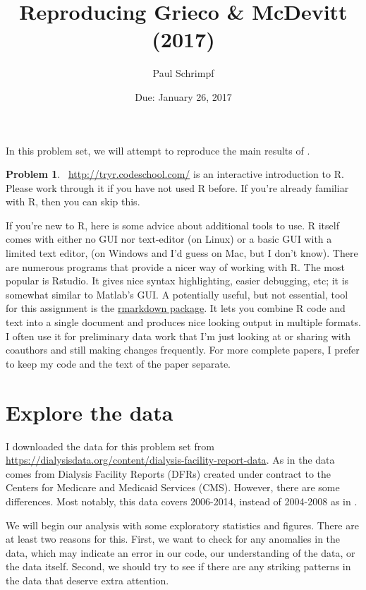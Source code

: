 \documentclass[11pt,reqno,letter]{article}
\title{Reproducing Grieco \& McDevitt (2017)}
\author{Paul Schrimpf}
\date{Due: January 26, 2017}
\renewcommand{\cite}{\citet}
\theoremstyle{definition}
\theoremstyle{problem}
\newtheorem{prob}{Problem}
\newenvironment{problem} 
  {\begin{mdframed}\begin{prob}$\,$}
  {\end{prob}\end{mdframed}}
\begin{document}
\maketitle

In this problem set, we will attempt to reproduce the main results of
\cite{grieco2017}. 

\begin{problem}
  \url{http://tryr.codeschool.com/} is an interactive introduction to
  R. Please work through it if you have not used R before. If you're
  already familiar with R, then you can skip this.
\end{problem}

If you're new to R, here is some advice about additional tools to
use. R itself comes with either no GUI nor text-editor (on Linux) or a
basic GUI with a limited text editor, (on Windows and I'd guess on
Mac, but I don't know). There are numerous programs that provide a
nicer way of working with R. The most popular is Rstudio. It gives
nice syntax highlighting, easier debugging, etc; it is somewhat
similar to Matlab's GUI. A potentially useful, but not essential, tool
for this assignment is the
\href{http://rmarkdown.rstudio.com/}{rmarkdown package}. It lets you
combine R code and text into a single document and produces nice
looking output in multiple formats. I often use it for preliminary
data work that I'm just looking at or sharing with coauthors and still
making changes frequently. For more complete papers, I prefer to keep
my code and the text of the paper separate. 

\section{Explore the data}

I downloaded the data for this problem set from
\url{https://dialysisdata.org/content/dialysis-facility-report-data}. As
in \cite{grieco2017} the data comes from Dialysis Facility Reports
(DFRs) created under contract to the Centers for Medicare and Medicaid
Services (CMS). However, there are some differences. Most notably,
this data covers 2006-2014, instead of 2004-2008 as in
\cite{grieco2017}. 

We will begin our analysis with some exploratory statistics and
figures. There are at least two reasons for this. First, we want to
check for any anomalies in the data, which may indicate an error in
our code, our understanding of the data, or the data itself. Second,
we should try to see if there are any striking patterns in the data
that deserve extra attention.
\end{document}
